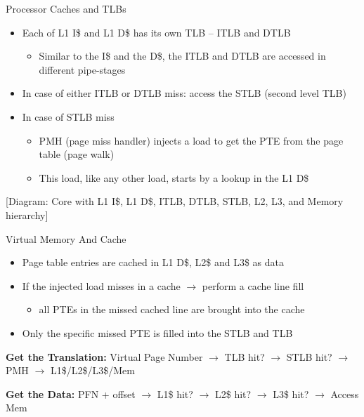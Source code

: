 \documentclass[aspectratio=169,12pt]{beamer}
\begin{document}
\begin{frame}{Processor Caches and TLBs}
\begin{itemize}
\item Each of L1 I\$ and L1 D\$ has its own TLB – ITLB and DTLB
    \begin{itemize}
    \item Similar to the I\$ and the D\$, the ITLB and DTLB are accessed in different pipe-stages
    \end{itemize}
\item In case of either ITLB or DTLB miss: access the STLB (second level TLB)
\item In case of STLB miss
    \begin{itemize}
    \item PMH (page miss handler) injects a load to get the PTE from the page table (page walk)
    \item This load, like any other load, starts by a lookup in the L1 D\$
    \end{itemize}
\end{itemize}
\begin{center}
[Diagram: Core with L1 I\$, L1 D\$, ITLB, DTLB, STLB, L2, L3, and Memory hierarchy]
\end{center}
\end{frame}

\begin{frame}{Virtual Memory And Cache}
\begin{itemize}
\item Page table entries are cached in L1 D\$, L2\$ and L3\$ as data
\item If the injected load misses in a cache $\rightarrow$ perform a cache line fill
    \begin{itemize}
    \item all PTEs in the missed cached line are brought into the cache
    \end{itemize}
\item Only the specific missed PTE is filled into the STLB and TLB
\end{itemize}
\textbf{Get the Translation:}
Virtual Page Number $\rightarrow$ TLB hit? $\rightarrow$ STLB hit? $\rightarrow$ PMH $\rightarrow$ L1\$/L2\$/L3\$/Mem

\textbf{Get the Data:}
PFN + offset $\rightarrow$ L1\$ hit? $\rightarrow$ L2\$ hit? $\rightarrow$ L3\$ hit? $\rightarrow$ Access Mem
\end{frame}
\end{document}
